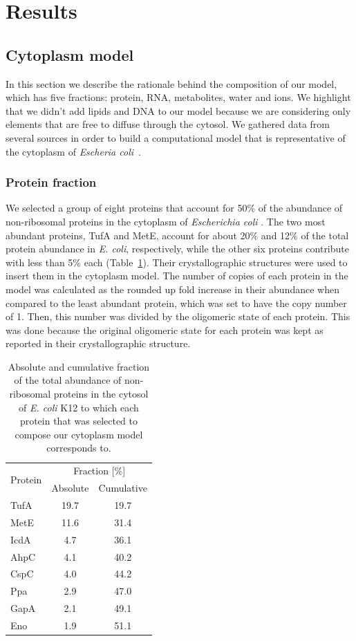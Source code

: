 \documentclass[journal=jacsat,manuscript=article]{achemso}
\begin{document}
\section*{Results}

\subsection{Cytoplasm model}
In this section we describe the rationale behind the composition of our model, which has five fractions: protein, RNA, metabolites, water and ions. We highlight that we didn't add lipids and DNA to our model because we are considering only elements that are free to diffuse through the cytosol. We gathered data from several sources in order to build a computational model that is representative of the cytoplasm of {\em Escheria coli}~\cite{Dong1996,Bennett2009,Link1997,Mcguffee2010}.

\subsubsection{Protein fraction}
We selected a group of eight proteins that account for 50\% of the abundance of non-ribosomal proteins in the cytoplasm of {\em Escherichia coli} \cite{Link1997}. The two most abundant proteins, TufA and MetE, account for about 20\% and 12\% of the total protein abundance in {\em E. coli}, respectively, while the other six proteins contribute with less than 5\% each (Table~\ref{tbl:protein_fraction}). Their crystallographic structures were used to insert them in the cytoplasm model. The number of copies of each protein in the model was calculated as the rounded up fold increase in their abundance when compared to the least abundant protein, which was set to have the copy number of 1. Then, this number was divided by the oligomeric state of each protein. This was done because the original oligomeric state for each protein was kept as reported in their crystallographic structure.

\begin{table}[H]
\centering
\begin{tabular}{ l c c }
\hline
\multirow{2}{*}{Protein} & 	\multicolumn{2}{c}{Fraction [\%]} \\
& Absolute & Cumulative \\ 
\hline
TufA & 19.7 & 19.7 \\
MetE & 11.6 & 31.4 \\
IcdA & 4.7  & 36.1 \\
AhpC & 4.1  & 40.2 \\
CspC & 4.0  & 44.2 \\
Ppa  & 2.9  & 47.0 \\
GapA & 2.1  & 49.1 \\
Eno  & 1.9  & 51.1 \\
\hline
\end{tabular}
\caption{Absolute and cumulative fraction of the total abundance of non-ribosomal proteins in the cytosol of {\em E. coli} K12 to which each protein that was selected to compose our cytoplasm model corresponds to.}
\label{tbl:protein_fraction}
\end{table}
\end{document}
